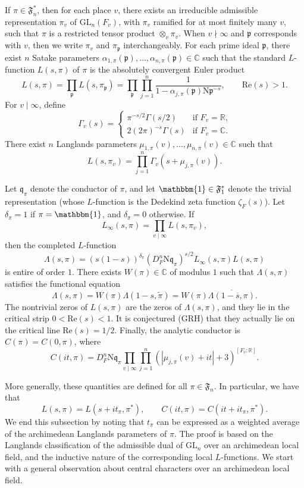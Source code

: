 \documentclass[12pt]{amsart}
\theoremstyle{definition}
\theoremstyle{remark}
\numberwithin{equation}{section}
\theoremstyle{plain}
\renewcommand{\tilde}{\widetilde}
\renewcommand{\bar}{\overline}
\renewcommand{\Re}{\mathrm{Re}}
\newcommand{\GL}{\mathrm{GL}}
\newcommand{\N}{\mathrm{N}}
\newcommand{\R}{\mathbb{R}}
\newcommand{\CC}{\mathbb{C}}
\newcommand{\kp}{\mathfrak{p}}
\newcommand{\kq}{\mathfrak{q}}
\begin{document}
If $\pi\in\mathfrak{F}_n^*$, then for each place $v$, there exists an irreducible admissible representation $\pi_v$ of $\GL_n(F_v)$, with $\pi_v$ ramified for at most finitely many $v$, such that $\pi$ is a restricted tensor product $\otimes_v \pi_v$. When $v\nmid\infty$ and $\kp$ corresponds with $v$, then we write $\pi_v$ and $\pi_{\kp}$ interchangeably. For each prime ideal $\kp$, there exist $n$ Satake parameters $\alpha_{1,\pi}(\kp),\dotsc,\alpha_{n,\pi}(\kp)\in\CC$ such that the standard $L$-function $L(s,\pi)$ of $\pi$ is the absolutely convergent Euler product
\[
L(s,\pi)=\prod_{\kp}L(s,\pi_{\kp}) = \prod_{\kp}\prod_{j=1}^n \frac{1}{1-\alpha_{j,\pi}(\kp)\N\kp^{-s}},\qquad\Re(s)>1.
\]
For $v\mid \infty$, define
\[
\Gamma_v(s)=\begin{cases}
\pi^{-s/2}\Gamma(s/2)&\mbox{if $F_v=\R$,}\\
2(2\pi)^{-s}\Gamma(s)&\mbox{if $F_v=\CC$.}
\end{cases}
\]
There exist $n$ Langlands parameters $\mu_{1,\pi}(v),\dotsc,\mu_{n,\pi}(v)\in\CC$ such that
\begin{equation}\label{eq:Lpiv}
L(s,\pi_{v})=\prod_{j=1}^n \Gamma_v(s+\mu_{j,\pi}(v)).
\end{equation}

Let $\kq_{\pi}$ denote the conductor of $\pi$, and let $\mathbbm{1}\in\mathfrak{F}_1^*$ denote the trivial representation (whose $L$-function is the Dedekind zeta function $\zeta_F(s)$). Let $\delta_{\pi}=1$ if $\pi=\mathbbm{1}$, and $\delta_{\pi}=0$ otherwise. If
\[
L_{\infty}(s,\pi)=\prod_{v\mid\infty}L(s,\pi_v),
\]
then the completed $L$-function
\[
\Lambda(s,\pi)=(s(1-s))^{\delta_{\pi}}(D_F^n\N\kq_{\pi})^{s/2}L_{\infty}(s,\pi)L(s,\pi)
\]
is entire of order $1$. There exists $W(\pi)\in\CC$ of modulus $1$ such that $\Lambda(s,\pi)$ satisfies the functional equation
\[
\Lambda(s,\pi)=W(\pi)\Lambda(1-s,\tilde\pi)=W(\pi)\overline{\Lambda(1-\bar{s},\pi)}.
\]
The nontrivial zeros of $L(s,\pi)$ are the zeros of $\Lambda(s,\pi)$, and they lie in the critical strip $0<\Re(s)<1$. It is conjectured (GRH) that they actually lie on the critical line $\Re(s)=1/2$. Finally, the analytic conductor is $C(\pi)=C(0,\pi)$, where
\begin{equation}
\label{eqn:AC_def_standard}
C(it,\pi) = D_F^n\N\kq_{\pi}\prod_{v\mid\infty}\prod_{j=1}^n (|\mu_{j,\pi}(v)+it|+3)^{[F_v:\R]}.
\end{equation}

More generally, these quantities are defined for all $\pi\in\mathfrak{F}_n$.  In particular, we have that
\[
L(s,\pi)=L(s+it_{\pi},\pi^*),\qquad C(it,\pi)=C(it+it_{\pi},\pi^*).
\]
We end this subsection by noting that $t_\pi$ can be expressed as a weighted average of the archimedean Langlands parameters of $\pi$. The proof is based on the Langlands classification of the admissible dual of $\GL_n$ over an archimedean local field, and the inductive nature of the corresponding local $L$-functions. We start with a general observation about central characters over an archimedean local field.
\end{document}

